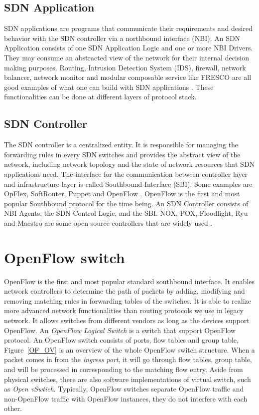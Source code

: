 \subsection{SDN Application}
\label{SDN Application}
SDN applications are programs that communicate their requirements and desired behavior with the SDN controller via a northbound interface (NBI). An SDN Application consists of one SDN Application Logic and one or more NBI Drivers. They may consume an abstracted view of the network for their internal decision making purposes. Routing, Intrusion Detection System (IDS), firewall, network balancer, network monitor and modular composable service like FRESCO are all good examples of what one can build with SDN applications \cite{SPYFGT13}. These functionalities can be done at different layers of protocol stack.

\subsection{SDN Controller}
\label{SDN Controller}
The SDN controller is a centralized entity. It is responsible for managing the forwarding rules in every SDN switches and provides the abstract view of the network, including network topology and the state of network resources that SDN applications need. The interface for the communication between controller layer and infrastructure layer is called Southbound Interface (SBI). Some examples are OpFlex, SoftRouter, Puppet and OpenFlow \cite{LNRSW04}. OpenFlow is the first and most popular Southbound protocol for the time being. An SDN Controller consists of NBI Agents, the SDN Control Logic, and the SBI. NOX, POX, Floodlight, Ryu and Maestro are some open source controllers that are widely used \cite{GKPPCMS08,EZA11}.

\section{OpenFlow switch}
\label{OpenFlow switch}
OpenFlow is the first and most popular standard southbound interface. It enables network controllers to determine the path of packets by adding, modifying and removing matching rules in forwarding tables of the switches. It is able to realize more advanced network functionalities than routing protocols we use in legacy network. It allows switches from different vendors as long as the devices support OpenFlow. An \textit{OpenFlow Logical Switch} is a switch that support OpenFlow protocol. An OpenFlow switch consists of ports, flow tables and group table, Figure~\ref{OF_OV} is an overview of the whole OpenFlow switch structure. When a packet comes in from the \textit{ingress port}, it will go through flow tables, group table, and will be processed in corresponding to the matching flow entry. Aside from physical switches, there are also software implementations of virtual switch, such as \textit{Open vSwtich}. Typically, OpenFlow switches separate OpenFlow traffic and non-OpenFlow traffic with OpenFlow instances, they do not interfere with each other. \cite{HP_SPEC}

